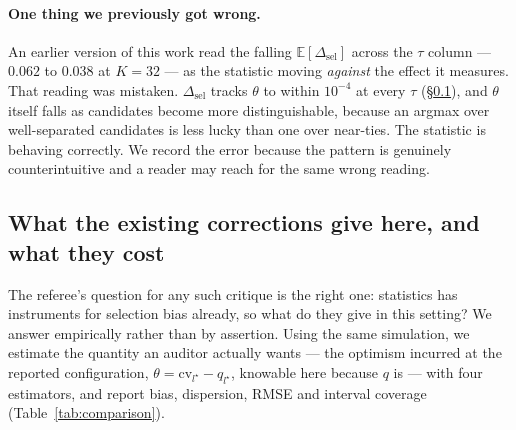 \documentclass{article}
\begin{document}
\paragraph{One thing we previously got wrong.} An earlier version of this
work read the falling $\mathbb{E}[\Delta_{\text{sel}}]$ across the $\tau$
column --- $0.062$ to $0.038$ at $K=32$ --- as the statistic moving
\emph{against} the effect it measures. That reading was mistaken.
$\Delta_{\text{sel}}$ tracks $\theta$ to within $10^{-4}$ at every $\tau$
(\S\ref{sec:comparison}), and $\theta$ itself falls as candidates become more
distinguishable, because an argmax over well-separated candidates is less
lucky than one over near-ties. The statistic is behaving correctly. We record
the error because the pattern is genuinely counterintuitive and a reader may
reach for the same wrong reading.

\subsection{What the existing corrections give here, and what they cost}
\label{sec:comparison}

The referee's question for any such critique is the right one: statistics has
instruments for selection bias already, so what do they give in this setting?
We answer empirically rather than by assertion. Using the same simulation, we
estimate the quantity an auditor actually wants --- the optimism incurred at
the reported configuration, $\theta=\text{cv}_{l^\star}-q_{l^\star}$, knowable
here because $q$ is --- with four estimators, and report bias, dispersion,
RMSE and interval coverage (Table~\ref{tab:comparison}).
\end{document}
